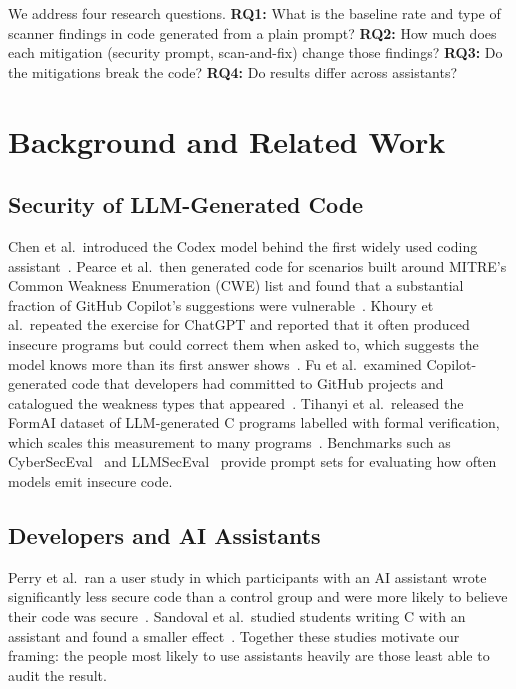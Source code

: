 \documentclass[conference]{IEEEtran}
\begin{document}
We address four research questions.
\textbf{RQ1:} What is the baseline rate and type of scanner findings in code generated from a plain prompt?
\textbf{RQ2:} How much does each mitigation (security prompt, scan-and-fix) change those findings?
\textbf{RQ3:} Do the mitigations break the code?
\textbf{RQ4:} Do results differ across assistants?

\section{Background and Related Work}
\subsection{Security of LLM-Generated Code}
Chen et al.\ introduced the Codex model behind the first widely used coding assistant~\cite{chen2021codex}. Pearce et al.\ then generated code for scenarios built around MITRE's Common Weakness Enumeration (CWE) list and found that a substantial fraction of GitHub Copilot's suggestions were vulnerable~\cite{pearce2022asleep}. Khoury et al.\ repeated the exercise for ChatGPT and reported that it often produced insecure programs but could correct them when asked to, which suggests the model knows more than its first answer shows~\cite{khoury2023secure}. Fu et al.\ examined Copilot-generated code that developers had committed to GitHub projects and catalogued the weakness types that appeared~\cite{fu2023security}. Tihanyi et al.\ released the FormAI dataset of LLM-generated C programs labelled with formal verification, which scales this measurement to many programs~\cite{tihanyi2023formai}. Benchmarks such as CyberSecEval~\cite{bhatt2023cyberseceval} and LLMSecEval~\cite{tony2023llmseceval} provide prompt sets for evaluating how often models emit insecure code.

\subsection{Developers and AI Assistants}
Perry et al.\ ran a user study in which participants with an AI assistant wrote significantly less secure code than a control group and were more likely to believe their code was secure~\cite{perry2023users}. Sandoval et al.\ studied students writing C with an assistant and found a smaller effect~\cite{sandoval2023lost}. Together these studies motivate our framing: the people most likely to use assistants heavily are those least able to audit the result.
\end{document}
